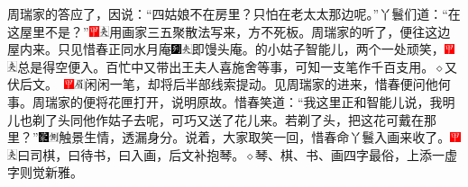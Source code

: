 周瑞家的答应了，因说：“四姑娘不在房里？只怕在老太太那边呢。”丫鬟们道：“在这屋里不是？”{\includegraphics[width=3mm]{../Images/00002}\includegraphics[width=3mm]{../Images/00012}\footnotesize \kaishu 用画家三五聚散法写来，方不死板。}周瑞家的听了，便往这边屋内来。只见惜春正同水月庵{\includegraphics[width=3mm]{../Images/00007}\includegraphics[width=3mm]{../Images/00012}\footnotesize \kaishu 即馒头庵。}的小姑子智能儿，两个一处顽笑，{\includegraphics[width=3mm]{../Images/00002}\includegraphics[width=3mm]{../Images/00012}\footnotesize \kaishu 总是得空便入。百忙中又带出王夫人喜施舍等事，可知一支笔作千百支用。{$\diamond$}又伏后文。　\includegraphics[width=3mm]{../Images/00002}\includegraphics[width=3mm]{../Images/00010}\footnotesize \kaishu 闲闲一笔，却将后半部线索提动。}见周瑞家的进来，惜春便问他何事。周瑞家的便将花匣打开，说明原故。惜春笑道：“我这里正和智能儿说，我明儿也剃了头同他作姑子去呢，可巧又送了花儿来。若剃了头，把这花可戴在那里？”{\includegraphics[width=3mm]{../Images/00006}\includegraphics[width=3mm]{../Images/00011}\footnotesize \kaishu 触景生情，透漏身分。}说着，大家取笑一回，惜春命丫鬟入画来收了。{\includegraphics[width=3mm]{../Images/00002}\includegraphics[width=3mm]{../Images/00012}\footnotesize \kaishu 曰司棋，曰待书，曰入画，后文补抱琴。{$\diamond$}琴、棋、书、画四字最俗，上添一虚字则觉新雅。}


